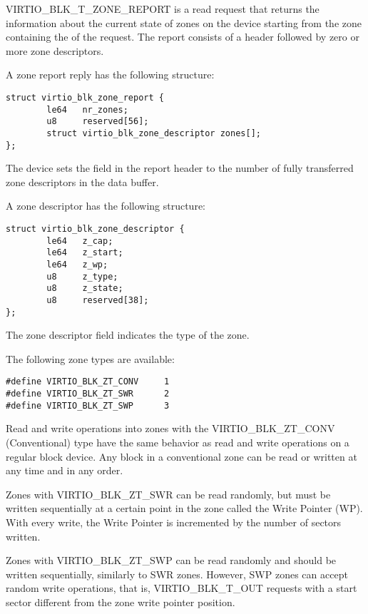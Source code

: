 VIRTIO_BLK_T_ZONE_REPORT is a read request that returns the information about
the current state of zones on the device starting from the zone containing the
 of the request. The report consists of a header followed by zero
or more zone descriptors.

A zone report reply has the following structure:

\begin{lstlisting}
struct virtio_blk_zone_report {
        le64   nr_zones;
        u8     reserved[56];
        struct virtio_blk_zone_descriptor zones[];
};
\end{lstlisting}

The device sets the  field in the report header to the number of
fully transferred zone descriptors in the data buffer.

A zone descriptor has the following structure:

\begin{lstlisting}
struct virtio_blk_zone_descriptor {
        le64   z_cap;
        le64   z_start;
        le64   z_wp;
        u8     z_type;
        u8     z_state;
        u8     reserved[38];
};
\end{lstlisting}

The zone descriptor field  
indicates the type of the zone.

The following zone types are available:

\begin{lstlisting}
#define VIRTIO_BLK_ZT_CONV     1
#define VIRTIO_BLK_ZT_SWR      2
#define VIRTIO_BLK_ZT_SWP      3
\end{lstlisting}

Read and write operations into zones with the VIRTIO_BLK_ZT_CONV (Conventional)
type have the same behavior as read and write operations on a regular block
device. Any block in a conventional zone can be read or written at any time and
in any order.

Zones with VIRTIO_BLK_ZT_SWR can be read randomly, but must be written
sequentially at a certain point in the zone called the Write Pointer (WP). With
every write, the Write Pointer is incremented by the number of sectors written.

Zones with VIRTIO_BLK_ZT_SWP can be read randomly and should be written
sequentially, similarly to SWR zones. However, SWP zones can accept random write
operations, that is, VIRTIO_BLK_T_OUT requests with a start sector different
from the zone write pointer position.


